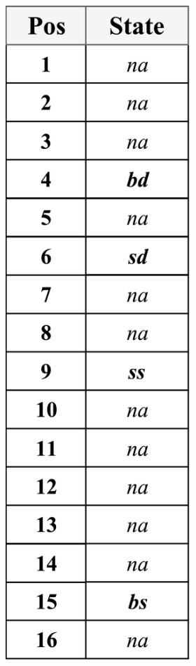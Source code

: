 \documentclass[]{interact}
\theoremstyle{plain}%
\theoremstyle{definition}
\theoremstyle{remark}
\begin{document}
\begin{figure}[]
\begin{subfigure}[b]{0.48\textwidth}
\begin{subfigure}[b]{.2\textwidth}
			\includegraphics[width=\textwidth]{./figs/table_presence.pdf}

\end{subfigure}
\end{subfigure}
\end{figure}
\end{document}
